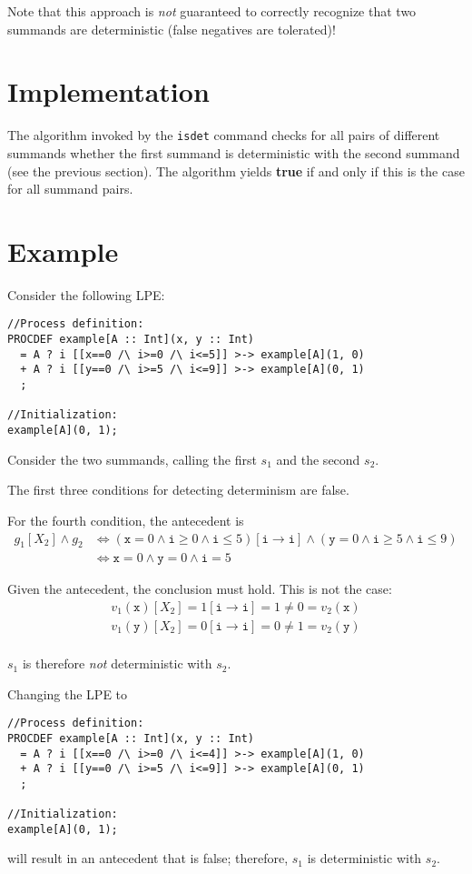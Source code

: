 Note that this approach is \emph{not} guaranteed to correctly recognize that two summands are deterministic (false negatives are tolerated)!

\section{Implementation}

The algorithm invoked by the \texttt{isdet} command checks for all pairs of different summands whether the first summand is deterministic with the second summand (see the previous section).
The algorithm yields \textbf{true} if and only if this is the case for all summand pairs.

\section{Example}

Consider the following LPE:

\begin{lstlisting}
//Process definition:
PROCDEF example[A :: Int](x, y :: Int)
  = A ? i [[x==0 /\ i>=0 /\ i<=5]] >-> example[A](1, 0)
  + A ? i [[y==0 /\ i>=5 /\ i<=9]] >-> example[A](0, 1)
  ;

//Initialization:
example[A](0, 1);
\end{lstlisting}

Consider the two summands, calling the first $s_1$ and the second $s_2$.

The first three conditions for detecting determinism are false.

For the fourth condition, the antecedent is
\begin{align*}
g_1[X_2] \land g_2 &\Leftrightarrow (\texttt{x} = 0 \land \texttt{i} \geq 0 \land \texttt{i} \leq 5)[\texttt{i} \rightarrow \texttt{i}] \land (\texttt{y} = 0 \land \texttt{i} \geq 5 \land \texttt{i} \leq 9) \\
&\Leftrightarrow \texttt{x} = 0 \land \texttt{y} = 0 \land \texttt{i} = 5
\end{align*}

Given the antecedent, the conclusion must hold.
This is not the case:
\begin{align*}
v_1(\texttt{x})[X_2] = 1[\texttt{i} \rightarrow \texttt{i}] = 1 \neq 0 = v_2(\texttt{x}) \\
v_1(\texttt{y})[X_2] = 0[\texttt{i} \rightarrow \texttt{i}] = 0 \neq 1 = v_2(\texttt{y}) \\
\end{align*}

$s_1$ is therefore \emph{not} deterministic with $s_2$.

Changing the LPE to

\begin{lstlisting}
//Process definition:
PROCDEF example[A :: Int](x, y :: Int)
  = A ? i [[x==0 /\ i>=0 /\ i<=4]] >-> example[A](1, 0)
  + A ? i [[y==0 /\ i>=5 /\ i<=9]] >-> example[A](0, 1)
  ;

//Initialization:
example[A](0, 1);
\end{lstlisting}

will result in an antecedent that is false; therefore, $s_1$ is deterministic with $s_2$.

